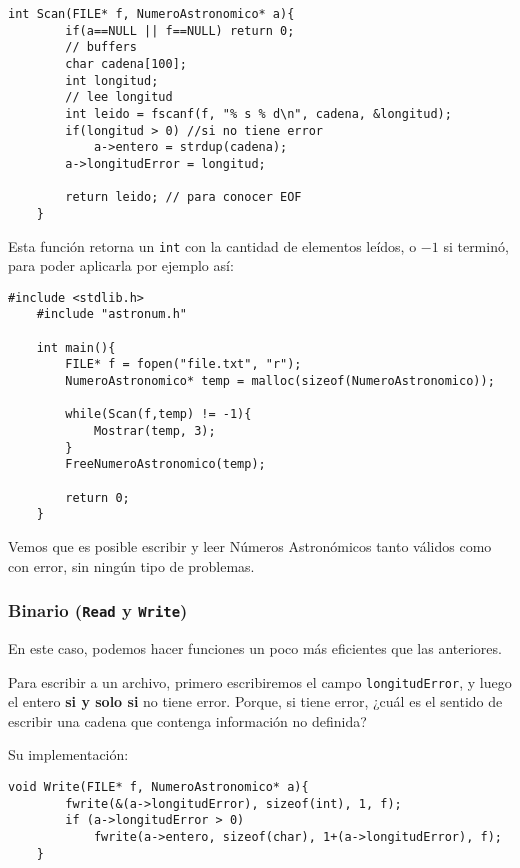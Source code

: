 \documentclass[a4paper, 12pt]{article}
\begin{document}
\begin{lstlisting}[style=C]
    int Scan(FILE* f, NumeroAstronomico* a){
        if(a==NULL || f==NULL) return 0;
        // buffers
        char cadena[100];
        int longitud;
        // lee longitud
        int leido = fscanf(f, "% s % d\n", cadena, &longitud);
        if(longitud > 0) //si no tiene error
            a->entero = strdup(cadena);
        a->longitudError = longitud;
    
        return leido; // para conocer EOF
    }
\end{lstlisting}

Esta función retorna un \verb|int| con la cantidad de elementos leídos, o $-1$ si terminó, para poder aplicarla por ejemplo así:

\begin{lstlisting}[style=C]
    #include <stdlib.h>
    #include "astronum.h"
    
    int main(){
        FILE* f = fopen("file.txt", "r");
        NumeroAstronomico* temp = malloc(sizeof(NumeroAstronomico));
        
        while(Scan(f,temp) != -1){
            Mostrar(temp, 3);
        }
        FreeNumeroAstronomico(temp);
        
        return 0;
    }
\end{lstlisting}

Vemos que es posible escribir y leer Números Astronómicos tanto válidos como con error, sin ningún tipo de problemas.

\subsubsection{Binario (\texttt{Read} y \texttt{Write})} \label{persistencia-binario}

En este caso, podemos hacer funciones un poco más eficientes que las anteriores.

Para escribir a un archivo, primero escribiremos el campo \texttt{longitudError}, y luego el entero \textbf{si y solo si} no tiene error. Porque, si tiene error, ¿cuál es el sentido de escribir una cadena que contenga información no definida?

Su implementación:

\begin{lstlisting}[style=C]
    void Write(FILE* f, NumeroAstronomico* a){
        fwrite(&(a->longitudError), sizeof(int), 1, f);
        if (a->longitudError > 0)
            fwrite(a->entero, sizeof(char), 1+(a->longitudError), f);
    }
\end{lstlisting}
\end{document}
